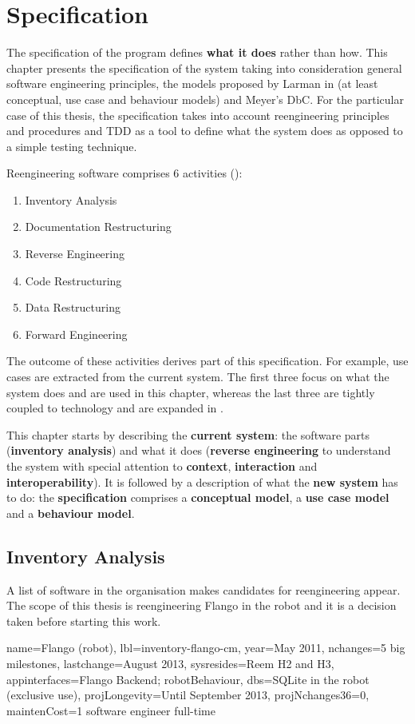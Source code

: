 \chapter{Specification}
The specification of the program defines \textbf{what it does} rather than how.
This chapter presents the specification of the system taking into consideration general software engineering principles, the models proposed by Larman  in \cite{Larman:2004} (at least conceptual, use case and behaviour models) and Meyer's \ac{DbC}.
For the particular case of this thesis, the specification takes into account reengineering principles and procedures and \ac{TDD} as a tool to define what the system does as opposed to a simple testing technique.

Reengineering software comprises 6 activities (): 
\begin{enumerate}
    \item Inventory Analysis
    \item Documentation Restructuring
    \item Reverse Engineering
    \item Code Restructuring
    \item Data Restructuring
    \item Forward Engineering
\end{enumerate}   
   
The outcome of these activities derives part of this specification.
For example, use cases are extracted from the current system.
The first three focus on what the system does and are used in this chapter, whereas the last three are tightly coupled to technology and are expanded in .

This chapter starts by describing the \textbf{current system}: the software parts (\textbf{inventory analysis}) and what it does (\textbf{reverse engineering} to understand the system with special attention to \textbf{context}, \textbf{interaction} and \textbf{interoperability}).
It is followed by a description of what the \textbf{new system} has to do: the \textbf{specification} comprises a \textbf{conceptual model}, a \textbf{use case model} and a \textbf{behaviour model}.

\section{Inventory Analysis}
A list of software in the organisation makes candidates for reengineering appear.
The scope of this thesis is reengineering Flango \cm in the robot and it is a decision taken before starting this work.
\begin{inventory}
{name=Flango \cm (robot),
lbl=inventory-flango-cm, 
year=May 2011,
nchanges=5 big milestones,
lastchange=August 2013,
sysresides=Reem H2 and H3,
appinterfaces=Flango Backend; robotBehaviour,
dbs=SQLite in the robot (exclusive use),
projLongevity=Until September 2013,
projNchanges36=0,
maintenCost=1 software engineer full-time
}
\end{inventory}

